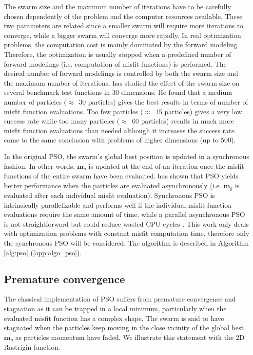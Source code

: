 The swarm size and the maximum number of iterations have to be carefully chosen dependently of the problem and the computer resources available. These two parameters are related since a smaller swarm will require more iterations to converge, while a bigger swarm will converge more rapidly. In real optimization problems, the computation cost is mainly dominated by the forward modeling. Therefore, the optimization is usually stopped when a predefined number of forward modelings (i.e. computation of misfit functions) is performed. The desired number of forward modelings is controlled by both the swarm size and the maximum number of iterations. \cite{Trelea2003} has studied the effect of the swarm size on several benchmark test functions in 30 dimensions. He found that a medium number of particles ($\approx$~30 particles) gives the best results in terms of number of misfit function evaluations. Too few particles ($\approx$~15 particles) gives a very low success rate while too many particles ($\approx$~60 particles) results in much more misfit function evaluations than needed although it increases the success rate. \cite{Piccand2008} came to the same conclusion with problems of higher dimensions (up to 500).

In the original PSO, the swarm's global best position is updated in a synchronous fashion. In other words, $\mathbf{m}_{g}$ is updated at the end of an iteration once the misfit functions of the entire swarm have been evaluated. \cite{Carlisle2001} has shown that PSO yields better performance when the particles are evaluated asynchronously (i.e. $\mathbf{m}_{g}$ is evaluated after each individual misfit evaluation). Synchronous PSO is intrinsically parallelizable and performs well if the individual misfit function evaluations require the same amount of time, while a parallel asynchronous PSO is not straightforward but could reduce wasted CPU cycles \citep{Schutte2004, Koh2006}. This work only deals with optimization problems with constant misfit computation time, therefore only the synchronous PSO will be considered. The algorithm is described in Algorithm \ref{alg:pso} (\ref{app:algo_pso}).


\subsection{Premature convergence}
\label{ssec:premature_convergence}

The classical implementation of PSO suffers from premature convergence and stagnation as it can be trapped in a local minimum, particularly when the evaluated misfit function has a complex shape. The swarm is said to have stagnated when the particles keep moving in the close vicinity of the global best $\mathbf{m}_{g}$ as particles momentum have faded. We illustrate this statement with the 2D Rastrigin function.

